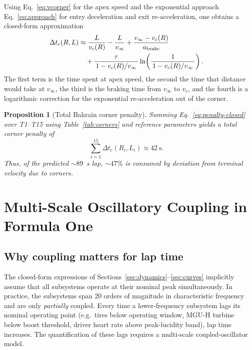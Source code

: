 \documentclass[11pt,twocolumn]{article}
\newtheorem{proposition}[theorem]{Proposition}
\theoremstyle{definition}
\theoremstyle{remark}
\begin{document}
Using Eq.~\eqref{eq:vcorner} for the apex speed and the exponential approach
Eq.~\eqref{eq:approach} for entry deceleration and exit re-acceleration, one
obtains a closed-form approximation
\begin{align}
  \Delta t_c(R, L) &\approx \frac{L}{v_c(R)} - \frac{L}{v_\infty}
  + \frac{v_\infty - v_c(R)}{a_{\mathrm{brake}}} \notag\\
  &\quad + \frac{\tau}{\,1 - v_c(R)/v_\infty\,}
  \ln\!\left(\frac{1}{\,1 - v_c(R)/v_\infty\,}\right).
  \label{eq:penalty-closed}
\end{align}
The first term is the time spent at apex speed, the second the time that
distance would take at $v_\infty$, the third is the braking time from
$v_\infty$ to $v_c$, and the fourth is a logarithmic correction for the
exponential re-acceleration out of the corner.

\begin{proposition}[Total Bahrain corner penalty]
\label{prop:totalpenalty}
Summing Eq.~\eqref{eq:penalty-closed} over T1--T15 using
Table~\ref{tab:corners} and reference parameters yields a total corner
penalty of
\[
  \sum_{i=1}^{15} \Delta t_c(R_i, L_i) \approx 42~\mathrm{s}.
\]
Thus, of the predicted $\sim 89$~s lap, $\sim 47\%$ is consumed by deviation
from terminal velocity due to corners.
\end{proposition}



\section{Multi-Scale Oscillatory Coupling in Formula One}
\label{sec:oscillatory}

\subsection{Why coupling matters for lap time}

The closed-form expressions of Sections~\ref{sec:dynamics}--\ref{sec:curves}
implicitly assume that all subsystems operate at their nominal peak
simultaneously. In practice, the subsystems span 20 orders of magnitude in
characteristic frequency and are only \emph{partially} coupled. Every time a
lower-frequency subsystem lags its nominal operating point (e.g.\ tires below
operating window, MGU-H turbine below boost threshold, driver heart rate
above peak-lucidity band), lap time increases. The quantification of these
lags requires a multi-scale coupled-oscillator model.
\end{document}
